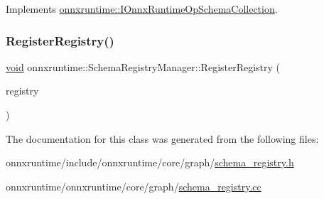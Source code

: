 Implements \mbox{\hyperlink{classonnxruntime_1_1IOnnxRuntimeOpSchemaCollection_a9ac69a75ece4f75b614e6b352f8501f0}{onnxruntime\+::\+I\+Onnx\+Runtime\+Op\+Schema\+Collection}}.

\mbox{\label{classonnxruntime_1_1SchemaRegistryManager_a556cd4ab1757b655ce2b898c3b05c066}} 
\subsubsection{\texorpdfstring{Register\+Registry()}{RegisterRegistry()}}
{\footnotesize\ttfamily \mbox{\hyperlink{mlasi_8h_a88f941d423cb2a819b70a1358982b1a6}{void}} onnxruntime\+::\+Schema\+Registry\+Manager\+::\+Register\+Registry (\begin{DoxyParamCaption}\item[{std\+::shared\+\_\+ptr$<$ \mbox{\hyperlink{classonnxruntime_1_1IOnnxRuntimeOpSchemaCollection}{I\+Onnx\+Runtime\+Op\+Schema\+Collection}} $>$}]{registry }\end{DoxyParamCaption})}



The documentation for this class was generated from the following files\+:\begin{DoxyCompactItemize}
\item 
onnxruntime/include/onnxruntime/core/graph/\mbox{\hyperlink{schema__registry_8h}{schema\+\_\+registry.\+h}}\item 
onnxruntime/onnxruntime/core/graph/\mbox{\hyperlink{schema__registry_8cc}{schema\+\_\+registry.\+cc}}\end{DoxyCompactItemize}
